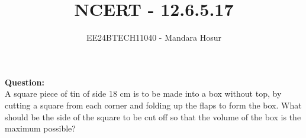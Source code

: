 \documentclass[journal]{IEEEtran}
\begin{document}

\vspace{3cm}

\title{NCERT - 12.6.5.17}
\author{EE24BTECH11040 - Mandara Hosur}
{\let\newpage\relax\maketitle}

\renewcommand{\thefigure}{\theenumi}
\renewcommand{\thetable}{\theenumi}
\setlength{\intextsep}{10pt} %


\renewcommand{\thetable}{\theenumi}

\textbf{Question:}\\
A square piece of tin of side 18 cm is to be made into a box without top, by cutting a square from each corner and folding up the flaps to form the box. What should be the side of the square to be cut off so that the volume of the box is the maximum possible? \\
\end{document}
